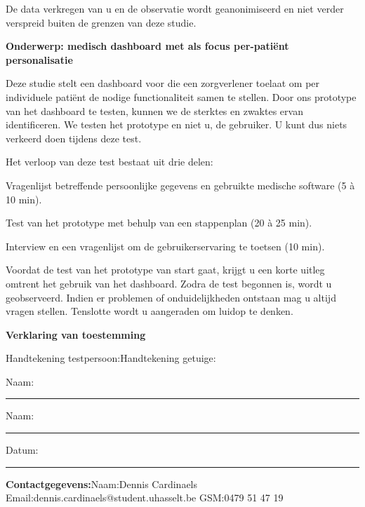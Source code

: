     \noindent De data verkregen van u en de observatie wordt geanonimiseerd en niet verder verspreid buiten de grenzen van deze studie.\bigskip

    \noindent\textbf{Onderwerp: medisch dashboard met als focus per-pati\"{e}nt personalisatie}\bigskip

    \noindent Deze studie stelt een dashboard voor die een zorgverlener toelaat om per individuele pati\"{e}nt de nodige functionaliteit samen te stellen. Door ons prototype van het dashboard te testen, kunnen we de sterktes en zwaktes ervan identificeren. We testen het prototype en niet u, de gebruiker. U kunt dus niets verkeerd doen tijdens deze test.\bigskip

    \noindent Het verloop van deze test bestaat uit drie delen:
    \vspace{-\topsep}
    \begin{myenumerate}
        \item Vragenlijst betreffende persoonlijke gegevens en gebruikte medische software (5 \`{a} 10 min).
        \item Test van het prototype met behulp van een stappenplan (20 \`{a} 25 min).
        \item Interview en een vragenlijst om de gebruikerservaring te toetsen (10 min).
    \end{myenumerate}

    \noindent Voordat de test van het prototype van start gaat, krijgt u een korte uitleg omtrent het gebruik van het dashboard. Zodra de test begonnen is, wordt u geobserveerd. Indien er problemen of onduidelijkheden ontstaan mag u altijd vragen stellen. Tenslotte wordt u aangeraden om luidop te denken.\bigskip

    \noindent\textbf{Verklaring van toestemming}\bigskip

    \noindent Handtekening testpersoon:\quad\quad\quad\quad\quad\quad\quad Handtekening getuige:\bigskip\bigskip

    \noindent Naam: \rule{0.29\textwidth}{0.4pt} \quad\quad\quad\quad\quad Naam: \rule{0.29\textwidth}{0.4pt}\medskip

    \noindent Datum: \rule{0.15\textwidth}{0.4pt}\medskip

    \noindent\textbf{Contactgegevens:}\quad Naam:\hspace{10pt}Dennis Cardinaels\newline
    \hspace*{97pt}Email:\hspace{10pt}dennis.cardinaels@student.uhasselt.be\newline
    \hspace*{97pt}GSM\@:\hspace{13pt}0479 51 47 19

